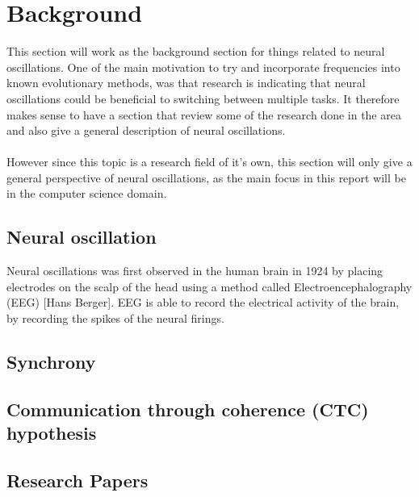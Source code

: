 \documentclass[11pt, a4paper]{article}
\begin{document}
\author{Mads Anthony}
\section{Background}
This section will work as the background section for things related to neural oscillations. One of the main motivation to try and incorporate frequencies into known evolutionary methods, was that research is indicating that neural oscillations could be beneficial to switching between multiple tasks. It therefore makes sense to have a section that review some of the research done in the area and also give a general description of neural oscillations.
\\
\\
However since this topic is a research field of it's own, this section will only give a general perspective of neural oscillations, as the main focus in this report will be in the computer science domain.
\subsection{Neural oscillation}
Neural oscillations was first observed in the human brain in 1924 by placing electrodes on the scalp of the head using a method called Electroencephalography (EEG) [Hans Berger]. EEG is able to record the electrical activity of the brain, by recording the spikes of the neural firings.
\subsection{Synchrony}
\subsection{Communication through coherence (CTC) hypothesis}
\subsection{Research Papers}
\end{document}
